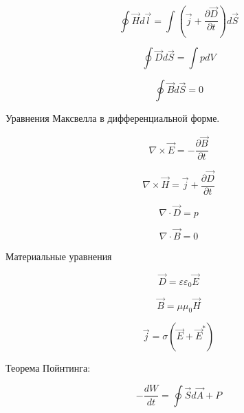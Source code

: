 \begin{equation}
\oint \overrightarrow{H} d \overrightarrow{l} = \int (\overrightarrow{j} + \frac{\partial \overrightarrow{D}}{\partial t}) d\overrightarrow{S}
\end{equation}


\begin{equation}
\oint \overrightarrow{D} d \overrightarrow{S} = \int p d V
\end{equation}


\begin{equation}
\oint \overrightarrow{B} d \overrightarrow{S} = 0
\end{equation}


Уравнения Максвелла в дифференциальной форме.


\begin{equation}
\nabla \times \overrightarrow{E} = - \frac{\partial \overrightarrow{B}}{\partial t}
\end{equation}

\begin{equation}
\nabla \times \overrightarrow{H} = \overrightarrow{j} + \frac{\partial \overrightarrow{D}}{\partial t}
\end{equation}

\begin{equation}
\nabla \cdot \overrightarrow{D} = p
\end{equation}


\begin{equation}
\nabla \cdot \overrightarrow{B} = 0
\end{equation}

Материальные уравнения


\begin{equation}
\overrightarrow{D} = \varepsilon \varepsilon_0 \overrightarrow{E}
\end{equation}

\begin{equation}
\overrightarrow{B} = \mu \mu_0 \overrightarrow{H}
\end{equation}

\begin{equation}
\overrightarrow{j} = \sigma (\overrightarrow{E} + \overrightarrow{E}^*)
\end{equation}


Теорема Пойнтинга:


\begin{equation}
- \frac{d W}{d t} = \oint \overrightarrow{S} d \overrightarrow{A} + P
\end{equation}


